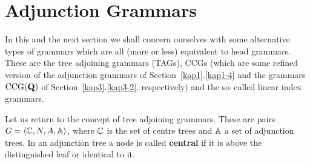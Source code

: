 \section{Adjunction Grammars}
\label{kap4-5}
%
%
%
In this and the next section we shall concern ourselves with some
alternative types of grammars which are all (more or less) equivalent
to head grammars. These are the tree adjoining grammars (TAGs), CCGs
(which are some refined version of the adjunction grammars of
Section~\ref{kap1}.\ref{kap1-4} and the grammars $\operatorname{CCG}(\mathbf{Q})$
of Section~\ref{kap3}.\ref{kap3-2}, respectively) and the so--called
linear index grammars.

Let us return to the concept of tree adjoining grammars.
These are pairs $G = \langle \mathbb{C}, N, A, \mathbb{A}\rangle$,
where $\mathbb{C}$ is the set of centre trees and
$\mathbb{A}$ a set of adjunction trees. In an adjunction
tree a node is called \textbf{central}
if it is above the distinguished leaf or identical to it.

